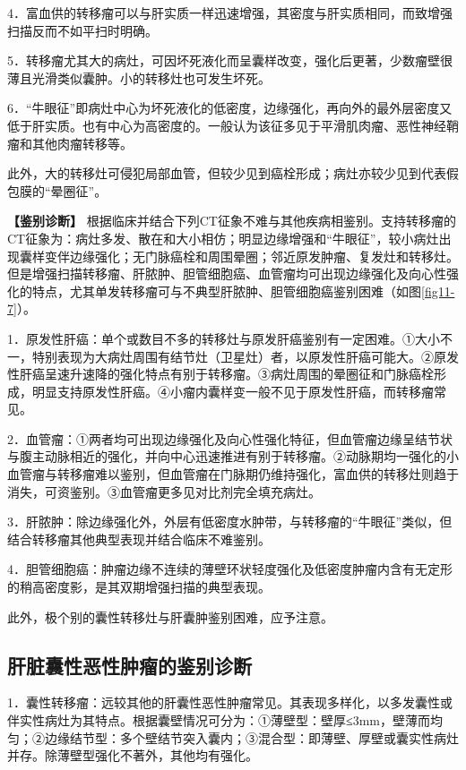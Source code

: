 4．富血供的转移瘤可以与肝实质一样迅速增强，其密度与肝实质相同，而致增强扫描反而不如平扫时明确。

5．转移瘤尤其大的病灶，可因坏死液化而呈囊样改变，强化后更著，少数瘤壁很薄且光滑类似囊肿。小的转移灶也可发生坏死。

6．“牛眼征”即病灶中心为坏死液化的低密度，边缘强化，再向外的最外层密度又低于肝实质。也有中心为高密度的。一般认为该征多见于平滑肌肉瘤、恶性神经鞘瘤和其他肉瘤转移等。

此外，大的转移灶可侵犯局部血管，但较少见到癌栓形成；病灶亦较少见到代表假包膜的“晕圈征”。

\textbf{【鉴别诊断】}
根据临床并结合下列CT征象不难与其他疾病相鉴别。支持转移瘤的CT征象为：病灶多发、散在和大小相仿；明显边缘增强和“牛眼征”，较小病灶出现囊样变伴边缘强化；无门脉癌栓和周围晕圈；邻近原发肿瘤、复发灶和转移灶。但是增强扫描转移瘤、肝脓肿、胆管细胞癌、血管瘤均可出现边缘强化及向心性强化的特点，尤其单发转移瘤可与不典型肝脓肿、胆管细胞癌鉴别困难（如图\ref{fig11-7}）。

1．原发性肝癌：单个或数目不多的转移灶与原发肝癌鉴别有一定困难。①大小不一，特别表现为大病灶周围有结节灶（卫星灶）者，以原发性肝癌可能大。②原发性肝癌呈速升速降的强化特点有别于转移瘤。③病灶周围的晕圈征和门脉癌栓形成，明显支持原发性肝癌。④小瘤内囊样变一般不见于原发性肝癌，而转移瘤常见。

2．血管瘤：①两者均可出现边缘强化及向心性强化特征，但血管瘤边缘呈结节状与腹主动脉相近的强化，并向中心迅速推进有别于转移瘤。②动脉期均一强化的小血管瘤与转移瘤难以鉴别，但血管瘤在门脉期仍维持强化，富血供的转移灶则趋于消失，可资鉴别。③血管瘤更多见对比剂完全填充病灶。

3．肝脓肿：除边缘强化外，外层有低密度水肿带，与转移瘤的“牛眼征”类似，但结合转移瘤其他典型表现并结合临床不难鉴别。

4．胆管细胞癌：肿瘤边缘不连续的薄壁环状轻度强化及低密度肿瘤内含有无定形的稍高密度影，是其双期增强扫描的典型表现。

此外，极个别的囊性转移灶与肝囊肿鉴别困难，应予注意。

\subsection{肝脏囊性恶性肿瘤的鉴别诊断}

1．囊性转移瘤：远较其他的肝囊性恶性肿瘤常见。其表现多样化，以多发囊性或伴实性病灶为其特点。根据囊壁情况可分为：①薄壁型：壁厚≤3mm，壁薄而均匀；②边缘结节型：多个壁结节突入囊内；③混合型：即薄壁、厚壁或囊实性病灶并存。除薄壁型强化不著外，其他均有强化。

